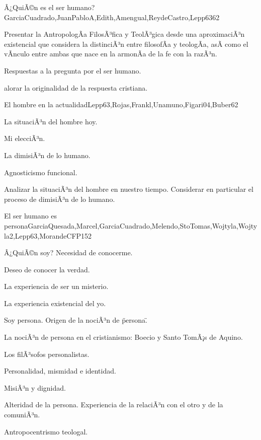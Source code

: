 \begin{syllabus}
\begin{unit}{Â¿QuiÃ©n es el ser humano?}{GarciaCuadrado,JuanPabloA,Edith,Amengual,ReydeCastro,Lepp63}{6}{2}
\begin{unitgoals}
	\item Presentar la AntropologÃ­a FilosÃ³fica y TeolÃ³gica desde una aproximaciÃ³n existencial que considera la distinciÃ³n entre filosofÃ­a y teologÃ­a, asÃ­ como el vÃ­nculo entre ambas que nace en la armonÃ­a de la fe con la razÃ³n.
	\item Respuestas a la pregunta por el ser humano.
	\item alorar la originalidad de la respuesta cristiana.
\end{unitgoals}
\end{unit}

\begin{unit}{El hombre en la actualidad}{Lepp63,Rojas,Frankl,Unamuno,Figari04,Buber}{6}{2}
\begin{topics}
 		\item La situaciÃ³n del hombre hoy.
 		\item Mi elecciÃ³n.
 		\item La dimisiÃ³n de lo humano.
 		\item Agnosticismo funcional.
\end{topics}

\begin{unitgoals}
	\item Analizar la situaciÃ³n del hombre en nuestro tiempo. Considerar en particular el proceso de dimisiÃ³n de lo humano. 
\end{unitgoals}
\end{unit}

\begin{unit}{El ser humano es persona}{GarciaQuesada,Marcel,GarciaCuadrado,Melendo,StoTomas,Wojtyla,Wojtyla2,Lepp63,MorandeCFP}{15}{2}
\begin{topics}
 		\item Â¿QuiÃ©n soy? Necesidad de conocerme.
 		\item Deseo de conocer la verdad.
 		\item La experiencia de ser un misterio.
 		\item La experiencia existencial del yo.
 		\item Soy persona. Origen de la nociÃ³n de \"persona\".
 		\item La nociÃ³n de persona en el cristianismo: Boecio y Santo TomÃ¡s de Aquino.
 		\item Los filÃ³sofos personalistas.
 		\item Personalidad, mismidad e identidad.
 		\item MisiÃ³n y dignidad.
 		\item Alteridad de la persona. Experiencia de la relaciÃ³n con el otro y de la comuniÃ³n.
 		\item Antropocentrismo teologal.
\end{topics}


\end{unit}
\end{syllabus}
